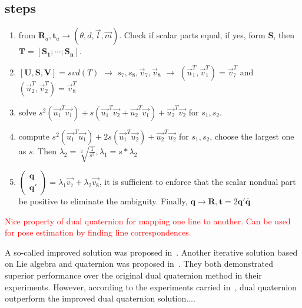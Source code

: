 \subsection{steps}
\begin{enumerate}
\item from $\mathbf{R}_a, \mathbf{t}_a \to (\theta, d, \vec{l}, \vec{m})$. Check if scalar parts equal, if yes, form $\mathbf{S}$, then $\mathbf{T}=[\mathbf{S_1};\cdots;\mathbf{S_n}]$.
\item $[\mathbf{U,S,V}]=svd(T)$ $\to$ $s_7, s_8, \vec{v}_7, \vec{v}_8$ $\to$ $(\vec{u}_1^T, \vec{v}_1^T) = \vec{v}_7^T$ and $(\vec{u}_2^T, \vec{v}_2^T) = \vec{v}_8^T$
\item solve $s^2(\vec{u_1}^T\vec{v_1})+s(\vec{u_1}^T\vec{v_2}+\vec{u_2}^T\vec{v_1})+\vec{u_2}^T\vec{v_2}$ for $s_1,s_2$.
\item compute $s^2(\vec{u_1}^T\vec{u_1})+2s(\vec{u_1}^T\vec{u_2})+\vec{u_2}^T\vec{u_2}$ for $s_1,s_2$, choose the largest one as $s$. Then $\lambda_2=\sqrt[2]{\frac{1}{s^2}}, \lambda_1=s*\lambda_2$
\item $\left( \begin{matrix}
\mathbf{q} \\
\mathbf{q}'
\end{matrix} \right)=\lambda_1 \vec{v_7} + \lambda_2 \vec{v_8}$, it is sufficient to enforce that the scalar nondual part be positive to eliminate the ambiguity. Finally, $\mathbf{q} \to \mathbf{R}, \mathbf{t}=2\mathbf{q'}\bar{\mathbf{q}}$
\end{enumerate}

\textcolor{red}{Nice property of dual quaternion for mapping one line to another. Can be used for pose estimation by finding line correspondences.}

A so-called improved solution was proposed in~\cite{malti2010robust}. Another iterative solution based on Lie algebra and quaternion was proposed in~\cite{pachtrachai2018adjoint}. They both demonstrated superior performance over the original dual quaternion method in their experiments. However, according to the experiments carried in~\cite{pachtrachai2018adjoint}, dual quaternion outperform the improved dual quaternion solution....

